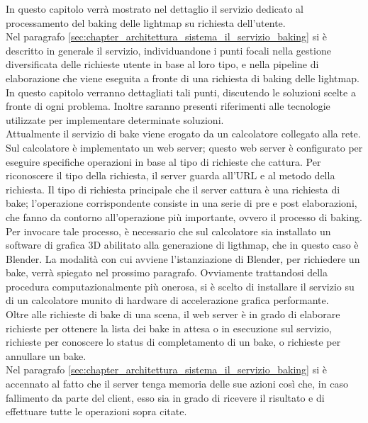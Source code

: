 In questo capitolo verrà mostrato nel dettaglio il servizio dedicato al processamento del baking delle lightmap su richiesta dell’utente. 
\\
Nel paragrafo \ref{sec:chapter_architettura_sistema_il_servizio_baking} si è descritto in generale il servizio, individuandone i punti focali nella gestione diversificata delle richieste utente in base al loro tipo, e nella pipeline di elaborazione che viene eseguita a fronte di una richiesta di baking delle lightmap. In questo capitolo verranno dettagliati tali punti, discutendo le soluzioni scelte a fronte di ogni problema. Inoltre saranno presenti riferimenti alle tecnologie utilizzate per implementare determinate soluzioni. 
\\
Attualmente il servizio di bake viene erogato da un calcolatore collegato alla rete.
Sul calcolatore è implementato un web server; questo web server è configurato per eseguire specifiche operazioni in base al tipo di richieste che cattura. Per riconoscere il tipo della richiesta, il server guarda all’URL e al metodo della richiesta. Il tipo di richiesta principale che il server cattura è una richiesta di bake; l’operazione corrispondente consiste in una serie di pre e post elaborazioni, che fanno da contorno all’operazione più importante, ovvero il processo di baking. Per invocare tale processo, è necessario che sul calcolatore sia installato un software di grafica 3D abilitato alla generazione di ligthmap, che in questo caso è Blender. La modalità con cui avviene l’istanziazione di Blender, per richiedere un bake, verrà spiegato nel prossimo paragrafo. Ovviamente trattandosi della procedura computazionalmente più onerosa, si è scelto di installare il servizio su di un calcolatore munito di hardware di accelerazione grafica performante. 
\\
Oltre alle richieste di bake di una scena, il web server è in grado di elaborare richieste per ottenere la lista dei bake in attesa o in esecuzione sul servizio, richieste per conoscere lo status di completamento di un bake, o richieste per annullare un bake.
\\ 
Nel paragrafo \ref{sec:chapter_architettura_sistema_il_servizio_baking} si è accennato al fatto che il server tenga memoria delle sue azioni così che, in caso fallimento da parte del client, esso sia in grado di ricevere il risultato e di effettuare tutte le operazioni sopra citate.